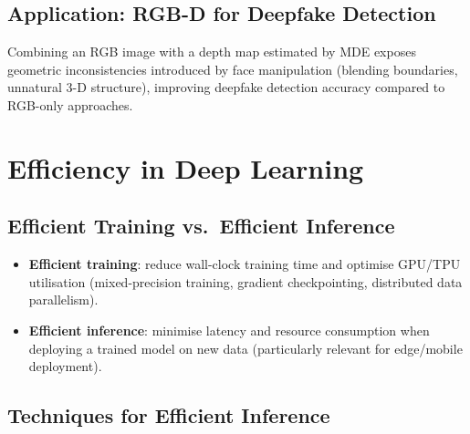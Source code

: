 \documentclass[12pt,a4paper]{report}
\begin{document}
\section{Application: RGB-D for Deepfake Detection}

Combining an RGB image with a depth map estimated by MDE exposes geometric
inconsistencies introduced by face manipulation (blending boundaries,
unnatural 3-D structure), improving deepfake detection accuracy compared to
RGB-only approaches.

\chapter{Efficiency in Deep Learning}

\section{Efficient Training vs.\ Efficient Inference}

\begin{itemize}[itemsep=2pt]
    \item \textbf{Efficient training}: reduce wall-clock training time and
          optimise GPU/TPU utilisation (mixed-precision training, gradient
          checkpointing, distributed data parallelism).
    \item \textbf{Efficient inference}: minimise latency and resource
          consumption when deploying a trained model on new data
          (particularly relevant for edge/mobile deployment).
\end{itemize}

\section{Techniques for Efficient Inference}
\end{document}
